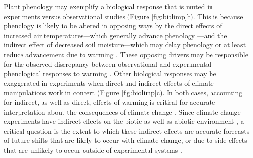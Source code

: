 \documentclass{article}
\begin{document}
\par Plant phenology may exemplify a biological response that is muted in experiments versus observational studies (Figure \ref{fig:biolimp}b). This is because phenology is likely to be altered in opposing ways by the direct effects of increased air temperatures---which generally advance phenology \citep{wolkovich2012}---and the indirect effect of decreased soil moisture---which may delay phenology or at least reduce advancement due to warming \citep{penuelas2004,craine2012,matthews2016}. %
These opposing drivers may be responsible for the observed discrepancy between observational and experimental phenological responses to warming \citep{wolkovich2012}. Other biological responses may be exaggerated in experiments when direct and indirect effects of climate manipulations work in concert (Figure \ref{fig:biolimp}c). In both cases, accounting for indirect, as well as direct, effects of warming is critical for accurate interpretation about the consequences of climate change \citep{kharouba2015}. Since climate change experiments have indirect effects on the biotic as well as abiotic environment \citep{hoeppner2012,pelini2014,diamond2016}, a critical question is the extent to which these indirect effects are accurate forecasts of future shifts that are likely to occur with climate change, or due to side-effects that are unlikely to occur outside of experimental systems \citep{moise2010,diamond2013}.
\end{document}
